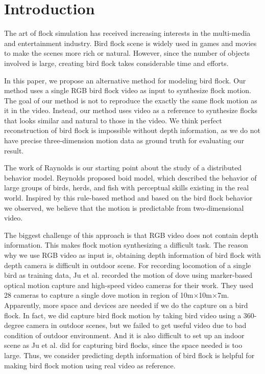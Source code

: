 \chapter{Introduction}


  The art of flock simulation has received increasing interests in the multi-media and entertainment industry. Bird flock scene is widely used in games and movies to make the scenes more rich or natural. However, since the number of objects involved is large, creating bird flock takes considerable time and efforts.


In this paper, we propose an alternative method for modeling bird flock. Our method uses a single RGB bird flock video as input to synthesize flock motion. The goal of our method is not to reproduce the exactly the same flock motion as it in the video. Instead, our method uses video as a reference to synthesize flocks that looks similar and natural to those in the video. We think perfect reconstruction of bird flock is impossible without depth information, as we do not have precise three-dimension motion data as ground truth for evaluating our result.


The work of Raynolds \cite{Boid, Steering} is our starting point about the study of a distributed behavior model. Reynolds proposed boid model, which described the behavior of large groups of birds, herds, and fish with perceptual skills existing in the real world. Inspired by this rule-based method and based on the bird flock behavior we observed, we believe that the motion is predictable from two-dimensional video.


The biggest challenge of this approach is that RGB video does not contain depth information. This makes flock motion synthesizing a difficult task. The reason why we use RGB video as input is, obtaining depth information of bird flock with depth camera is difficult in outdoor scene. For recording locomotion of a single bird as training data, Ju et al.\cite{Flappy} recorded the motion of dove using marker-based optical motion capture and high-speed video cameras for their work. They used 28 cameras to capture a single dove motion in region of 10m×10m×7m. Apparently, more space and devices are needed if we do the capture on a bird flock. In fact, we did capture bird flock motion by taking bird video using a 360-degree camera in outdoor scenes, but we failed to get useful video due to bad condition of outdoor environment. And it is also difficult to set up an indoor scene as Ju et al. did for capturing bird flocks, since the space needed is too large. Thus, we consider predicting depth information of bird flock is helpful for making bird flock motion using real video as reference.


